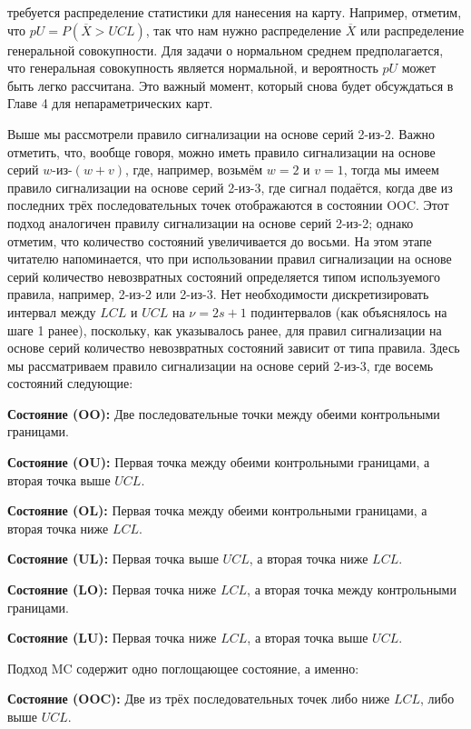 требуется распределение статистики для нанесения на карту. Например, отметим, что \(pU = P(\overline{X} > UCL)\), так что нам нужно распределение \(\overline{X}\) или распределение генеральной совокупности. Для задачи о нормальном среднем предполагается, что генеральная совокупность является нормальной, и вероятность \(pU\) может быть легко рассчитана. Это важный момент, который снова будет обсуждаться в Главе 4 для непараметрических карт.

Выше мы рассмотрели правило сигнализации на основе серий 2-из-2. Важно отметить, что, вообще говоря, можно иметь правило сигнализации на основе серий \(w\)-из-\((w + v)\), где, например, возьмём \(w = 2\) и \(v = 1\), тогда мы имеем правило сигнализации на основе серий 2-из-3, где сигнал подаётся, когда две из последних трёх последовательных точек отображаются в состоянии OOC. Этот подход аналогичен правилу сигнализации на основе серий 2-из-2; однако отметим, что количество состояний увеличивается до восьми. На этом этапе читателю напоминается, что при использовании правил сигнализации на основе серий количество невозвратных состояний определяется типом используемого правила, например, 2-из-2 или 2-из-3. Нет необходимости дискретизировать интервал между \(LCL\) и \(UCL\) на \(\nu = 2s + 1\) подинтервалов (как объяснялось на шаге 1 ранее), поскольку, как указывалось ранее, для правил сигнализации на основе серий количество невозвратных состояний зависит от типа правила. Здесь мы рассматриваем правило сигнализации на основе серий 2-из-3, где восемь состояний следующие:

\noindent\textbf{Состояние (OO):} Две последовательные точки между обеими контрольными границами.

\noindent\textbf{Состояние (OU):} Первая точка между обеими контрольными границами, а вторая точка выше \(UCL\).

\noindent\textbf{Состояние (OL):} Первая точка между обеими контрольными границами, а вторая точка ниже \(LCL\).

\noindent\textbf{Состояние (UL):} Первая точка выше \(UCL\), а вторая точка ниже \(LCL\).

\noindent\textbf{Состояние (LO):} Первая точка ниже \(LCL\), а вторая точка между контрольными границами.

\noindent\textbf{Состояние (LU):} Первая точка ниже \(LCL\), а вторая точка выше \(UCL\).

Подход MC содержит одно поглощающее состояние, а именно:

\noindent\textbf{Состояние (OOC):} Две из трёх последовательных точек либо ниже \(LCL\), либо выше \(UCL\).

